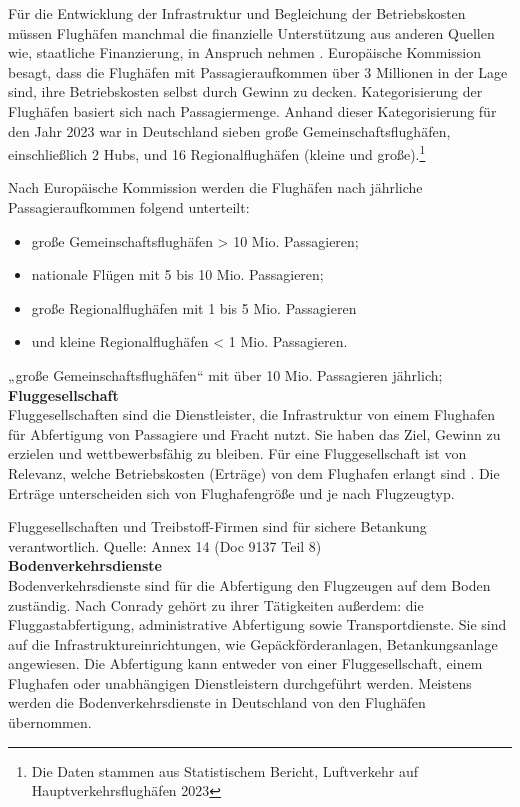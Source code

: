 Für die Entwicklung der Infrastruktur und Begleichung der Betriebskosten müssen Flughäfen manchmal die finanzielle Unterstützung aus anderen
Quellen wie, staatliche Finanzierung, in Anspruch nehmen \cite{schaar2010analysis}. Europäische Kommission besagt, dass die Flughäfen mit
Passagieraufkommen über 3 Millionen in der Lage sind, ihre Betriebskosten selbst durch Gewinn zu decken. 
Kategorisierung der Flughäfen basiert sich nach Passagiermenge. Anhand dieser Kategorisierung für den Jahr 2023 war in Deutschland 
sieben große Gemeinschaftsflughäfen, einschließlich 2 Hubs, und 16 Regionalflughäfen (kleine und große).\footnote{Die Daten stammen aus Statistischem Bericht, Luftverkehr auf Hauptverkehrsflughäfen 2023}

Nach Europäische Kommission werden die Flughäfen nach jährliche Passagieraufkommen folgend unterteilt: 
\begin{itemize}
    \item große Gemeinschaftsflughäfen > 10 Mio. Passagieren;
    \item nationale Flügen mit 5 bis 10 Mio. Passagieren;
    \item große Regionalflughäfen mit 1 bis 5 Mio. Passagieren
    \item und kleine Regionalflughäfen < 1 Mio. Passagieren.
    \end{itemize}„große Gemeinschaftsflughäfen“ mit über 10 Mio. Passagieren jährlich; 
%
\textbf{Fluggesellschaft} \\
Fluggesellschaften sind die Dienstleister, die Infrastruktur von einem Flughafen für Abfertigung von Passagiere und Fracht nutzt. 
Sie haben das Ziel, Gewinn zu erzielen und wettbewerbsfähig zu bleiben. Für eine Fluggesellschaft ist von Relevanz, welche Betriebskosten (Erträge)
von dem Flughafen erlangt sind \cite{schaar2010analysis}. Die Erträge unterscheiden sich von Flughafengröße und je nach Flugzeugtyp.

Fluggesellschaften und Treibstoff-Firmen sind für sichere Betankung verantwortlich. Quelle: Annex 14 (Doc 9137 Teil 8)
\\
\textbf{Bodenverkehrsdienste} \\ %
Bodenverkehrsdienste sind für die Abfertigung den Flugzeugen auf dem Boden zuständig. 
Nach Conrady \cite{conrady2019luftverkehr} gehört zu ihrer Tätigkeiten außerdem:  
die Fluggastabfertigung, administrative Abfertigung sowie Transportdienste.
Sie sind auf die Infrastruktureinrichtungen, wie Gepäckförderanlagen, Betankungsanlage angewiesen. 
Die Abfertigung kann entweder von einer Fluggesellschaft, einem Flughafen oder unabhängigen Dienstleistern durchgeführt werden. 
Meistens werden die Bodenverkehrsdienste in Deutschland von den Flughäfen übernommen. \\ %

